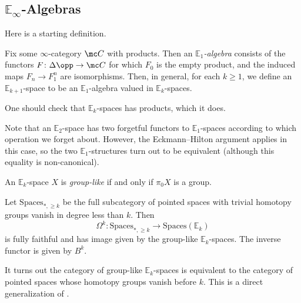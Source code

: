 \documentclass[../notes.tex]{subfiles}
\begin{document}
\subsection{\texorpdfstring{$\mathbb E_\infty$}{ E infinity}-Algebras}
Here is a starting definition.
\begin{defihelper} 
	Fix some $\infty$-category $\mc C$ with products. Then an \textit{$\mathbb E_1$-algebra} consists of the functors $F\colon\Delta\opp\to\mc C$ for which $F_0$ is the empty product, and the induced maps $F_n\to F_1^n$ are isomorphisms. Then, in general, for each $k\ge1$, we define an $\mathbb E_{k+1}$-space to be an $\mathbb E_1$-algebra valued in $\mathbb E_k$-spaces.
\end{defihelper}
\begin{remark}
	One should check that $\mathbb E_k$-spaces has products, which it does.
\end{remark}
\begin{remark}
	Note that an $\mathbb E_2$-space has two forgetful functors to $\mathbb E_1$-spaces according to which operation we forget about. However, the Eckmann--Hilton argument applies in this case, so the two $\mathbb E_1$-structures turn out to be equivalent (although this equality is non-canonical).
\end{remark}
\begin{definition}
	An $\mathbb E_k$-space $X$ is \textit{group-like} if and only if $\pi_0X$ is a group.
\end{definition}
\begin{theorem} \label{thm:may-recog}
	Let $\mathrm{Spaces}_{*,\ge k}$ be the full subcategory of pointed spaces with trivial homotopy groups vanish in degree less than $k$. Then
	\[\Omega^k\colon\mathrm{Spaces}_{*,\ge k}\to\mathrm{Spaces}(\mathbb E_k)\]
	is fully faithful and has image given by the group-like $\mathbb E_k$-spaces. The inverse functor is given by $B^{k}$.
\end{theorem}
\begin{remark}
	It turns out the category of group-like $\mathbb E_k$-spaces is equivalent to the category of pointed spaces whose homotopy groups vanish before $k$. This is a direct generalization of .
\end{remark}
\end{document}

